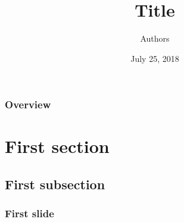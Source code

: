 \documentclass{beamer}
\title{Title}
\date{July 25, 2018}
\author{Authors}
\institute[Abbreviation]{Institute}
\begin{document}
\begin{frame}
\titlepage
\end{frame}

\begin{frame}
\frametitle{Overview}
\tableofcontents
\end{frame}

\section{First section}

\subsection{First subsection}

\begin{frame}
\frametitle{First slide}

\end{frame}
\end{document}
